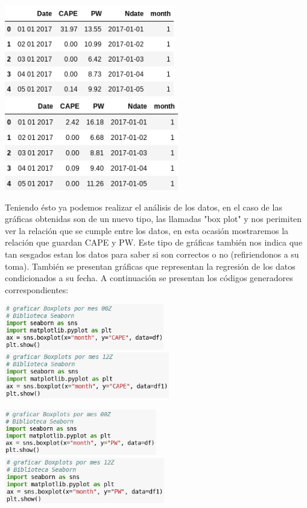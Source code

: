\documentclass[12pt]{article}
\begin{document}
\begin{center}
	\includegraphics[height=4cm]{conversion0.png} \hspace*{\fill}
    \includegraphics[height=4cm]{conversion01.png}
\end{center}
Teniendo ésto ya podemos realizar el análisis de los datos, en el caso de las gráficas obtenidas son de un nuevo tipo, las llamadas "box plot" y nos perimiten ver la relación que se cumple entre los datos, en esta ocasión mostraremos la relación que guardan CAPE y PW. Este tipo de gráficas también nos indica que tan sesgados estan los datos para saber si son correctos o no (refiriendonos a su toma). También se presentan gráficas que representan la regresión de los datos condicionados a su fecha. A continuación se presentan los códigos generadores correspondientes:
\begin{center}
	\includegraphics[height=2cm]{1.png} \hspace*{\fill}
    \includegraphics[height=2cm]{2.png}
\end{center}
\begin{center}
	\includegraphics[height=2cm]{11.png} \hspace*{\fill}
    \includegraphics[height=2cm]{22.png}
\end{center}
\end{document}

